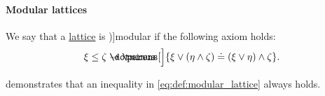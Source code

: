 \paragraph{Modular lattices}

\begin{definition}\label{def:modular_lattice}
  We say that a \hyperref[def:lattice]{lattice} is \term[ru=модулярная (решётка) (\cite[def. 4.6]{Гуров2013})]{modular} if the following axiom holds:
  \begin{equation}\label{eq:def:modular_lattice}
    \xi \leq \zeta \synimplies \parens[\Big]{ \xi \vee (\eta \wedge \zeta) \syneq (\xi \vee \eta) \wedge \zeta }.
  \end{equation}
\end{definition}
\begin{comments}
  \item {} demonstrates that an inequality in \eqref{eq:def:modular_lattice} always holds.
\end{comments}


